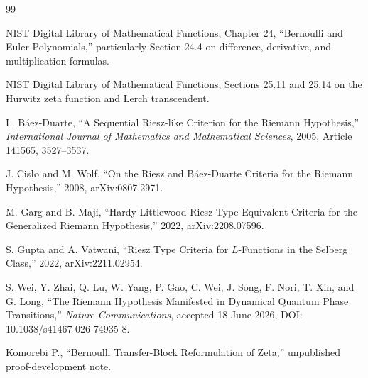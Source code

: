 \documentclass[11pt,openany]{report}
\theoremstyle{definition}
\theoremstyle{remark}
\begin{document}
\begin{thebibliography}{99}

NIST Digital Library of Mathematical Functions,
Chapter 24, ``Bernoulli and Euler Polynomials,''
particularly Section 24.4 on difference, derivative, and multiplication formulas.

NIST Digital Library of Mathematical Functions,
Sections 25.11 and 25.14 on the Hurwitz zeta function and Lerch transcendent.

L. B\'aez-Duarte,
``A Sequential Riesz-like Criterion for the Riemann Hypothesis,''
\emph{International Journal of Mathematics and Mathematical Sciences},
2005, Article 141565, 3527--3537.

J. Cis\l o and M. Wolf,
``On the Riesz and B\'aez-Duarte Criteria for the Riemann Hypothesis,''
2008, arXiv:0807.2971.

M. Garg and B. Maji,
``Hardy-Littlewood-Riesz Type Equivalent Criteria for the Generalized Riemann Hypothesis,''
2022, arXiv:2208.07596.

S. Gupta and A. Vatwani,
``Riesz Type Criteria for $L$-Functions in the Selberg Class,''
2022, arXiv:2211.02954.

S. Wei, Y. Zhai, Q. Lu, W. Yang, P. Gao, C. Wei, J. Song, F. Nori, T. Xin, and G. Long,
``The Riemann Hypothesis Manifested in Dynamical Quantum Phase Transitions,''
\emph{Nature Communications}, accepted 18 June 2026,
DOI: 10.1038/s41467-026-74935-8.

Komorebi P.,
``Bernoulli Transfer-Block Reformulation of Zeta,''
unpublished proof-development note.

\end{thebibliography}
\end{document}
